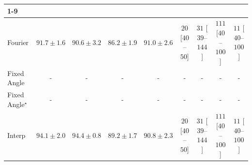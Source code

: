 \begin{tabular}{l|cccc|cccc|}
\cline{1-9}
\multicolumn{9}{c}{\rule{0pt}{8pt}PP} \\
\midrule
Fourier & {\cellcolor[HTML]{369D54}} \color[HTML]{F1F1F1} $91.7\pm 1.6$ & {\cellcolor[HTML]{45AD5F}} \color[HTML]{F1F1F1} $90.6\pm 3.2$ & {\cellcolor[HTML]{A2D88A}} \color[HTML]{000000} $86.2\pm 1.9$ & {\cellcolor[HTML]{3FA85B}} \color[HTML]{F1F1F1} $91.0\pm 2.6$ & {\cellcolor[HTML]{FFF5F1}} \color[HTML]{000000} $20$ [$40$--$50$] & {\cellcolor[HTML]{FEF1ED}} \color[HTML]{000000} $31$ [$39$--$144$] & {\cellcolor[HTML]{FDDBD7}} \color[HTML]{000000} $111$ [$40$--$100$] & {\cellcolor[HTML]{FFF7F3}} \color[HTML]{000000} $11$ [$40$--$100$] \\
Fixed Angle & {\cellcolor[HTML]{000000}} \color[HTML]{F1F1F1} {\cellcolor{white}} \color{black} - & {\cellcolor[HTML]{000000}} \color[HTML]{F1F1F1} {\cellcolor{white}} \color{black} - & {\cellcolor[HTML]{000000}} \color[HTML]{F1F1F1} {\cellcolor{white}} \color{black} - & {\cellcolor[HTML]{000000}} \color[HTML]{F1F1F1} {\cellcolor{white}} \color{black} - & {\cellcolor[HTML]{000000}} \color[HTML]{F1F1F1} {\cellcolor{white}} \color{black} - & {\cellcolor[HTML]{000000}} \color[HTML]{F1F1F1} {\cellcolor{white}} \color{black} - & {\cellcolor[HTML]{000000}} \color[HTML]{F1F1F1} {\cellcolor{white}} \color{black} - & {\cellcolor[HTML]{000000}} \color[HTML]{F1F1F1} {\cellcolor{white}} \color{black} - \\
Fixed Angle$^\star$ & {\cellcolor[HTML]{000000}} \color[HTML]{F1F1F1} {\cellcolor{white}} \color{black} - & {\cellcolor[HTML]{000000}} \color[HTML]{F1F1F1} {\cellcolor{white}} \color{black} - & {\cellcolor[HTML]{000000}} \color[HTML]{F1F1F1} {\cellcolor{white}} \color{black} - & {\cellcolor[HTML]{000000}} \color[HTML]{F1F1F1} {\cellcolor{white}} \color{black} - & {\cellcolor[HTML]{000000}} \color[HTML]{F1F1F1} {\cellcolor{white}} \color{black} - & {\cellcolor[HTML]{000000}} \color[HTML]{F1F1F1} {\cellcolor{white}} \color{black} - & {\cellcolor[HTML]{000000}} \color[HTML]{F1F1F1} {\cellcolor{white}} \color{black} - & {\cellcolor[HTML]{000000}} \color[HTML]{F1F1F1} {\cellcolor{white}} \color{black} - \\
Interp & {\cellcolor[HTML]{187B3F}} \color[HTML]{F1F1F1} $94.1\pm 2.0$ & {\cellcolor[HTML]{15793E}} \color[HTML]{F1F1F1} $94.4\pm 0.8$ & {\cellcolor[HTML]{64BC6F}} \color[HTML]{F1F1F1} $89.2\pm 1.7$ & {\cellcolor[HTML]{42AB5D}} \color[HTML]{F1F1F1} $90.8\pm 2.3$ & {\cellcolor[HTML]{FFF5F1}} \color[HTML]{000000} $20$ [$40$--$50$] & {\cellcolor[HTML]{FEF1ED}} \color[HTML]{000000} $31$ [$39$--$144$] & {\cellcolor[HTML]{FDDBD7}} \color[HTML]{000000} $111$ [$40$--$100$] & {\cellcolor[HTML]{FFF7F3}} \color[HTML]{000000} $11$ [$40$--$100$] \\

\end{tabular}
